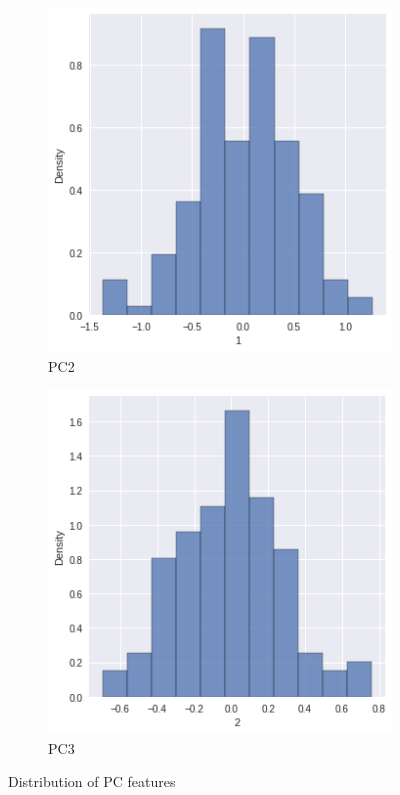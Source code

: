 \documentclass{homework}
\begin{document}
\begin{figure}[hbt!]
\begin{subfigure}[b]{0.3\textwidth}
         \includegraphics[width=\textwidth]{PC2_distribution.png}
         \caption{PC2}
     \end{subfigure}
     \hfill
     \begin{subfigure}[b]{0.3\textwidth}
         \centering
         \includegraphics[width=\textwidth]{PC3_distribution.png}
         \caption{PC3}
     \end{subfigure}
        \caption{Distribution of PC features}
\end{figure}
\end{document}
